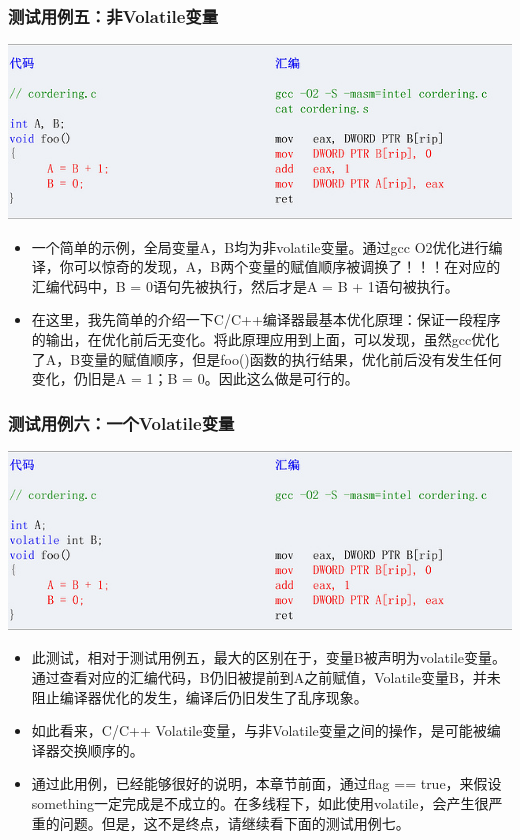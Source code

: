 \documentclass[9pt,b5paper]{article}
\begin{document}
\subsubsection{测试用例五：非Volatile变量}
\label{sec-9-3-1}
\includegraphics[width=.9\linewidth]{../pic/v6.jpg}
\begin{itemize}
\item 一个简单的示例，全局变量A，B均为非volatile变量。通过gcc O2优化进行编译，你可以惊奇的发现，A，B两个变量的赋值顺序被调换了！！！在对应的汇编代码中，B = 0语句先被执行，然后才是A = B + 1语句被执行。
\item 在这里，我先简单的介绍一下C/C++编译器最基本优化原理：保证一段程序的输出，在优化前后无变化。将此原理应用到上面，可以发现，虽然gcc优化了A，B变量的赋值顺序，但是foo()函数的执行结果，优化前后没有发生任何变化，仍旧是A = 1；B = 0。因此这么做是可行的。
\end{itemize}
\subsubsection{测试用例六：一个Volatile变量}
\label{sec-9-3-2}
\includegraphics[width=.9\linewidth]{../pic/v7.jpg}
\begin{itemize}
\item 此测试，相对于测试用例五，最大的区别在于，变量B被声明为volatile变量。通过查看对应的汇编代码，B仍旧被提前到A之前赋值，Volatile变量B，并未阻止编译器优化的发生，编译后仍旧发生了乱序现象。
\item 如此看来，C/C++ Volatile变量，与非Volatile变量之间的操作，是可能被编译器交换顺序的。
\item 通过此用例，已经能够很好的说明，本章节前面，通过flag == true，来假设something一定完成是不成立的。在多线程下，如此使用volatile，会产生很严重的问题。但是，这不是终点，请继续看下面的测试用例七。
\end{itemize}
\end{document}
